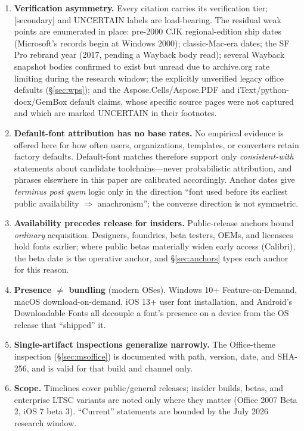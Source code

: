 \documentclass[10pt,a4paper]{article}
\begin{document}
\begin{enumerate}[leftmargin=1.5em,itemsep=3pt]
\item \textbf{Verification asymmetry.} Every citation carries its verification tier;
[secondary] and UNCERTAIN labels are load-bearing. The residual weak points are
enumerated in place: pre-2000 CJK regional-edition ship dates (Microsoft's records begin
at Windows 2000); classic-Mac-era dates; the SF Pro rebrand year (2017, pending a Wayback
body read); several Wayback snapshot bodies confirmed to exist but unread due to
archive.org rate limiting during the research window; the explicitly unverified legacy
office defaults (\S\ref{sec:wps}); and the Aspose.Cells/Aspose.PDF and
iText/python-docx/GemBox default claims, whose specific source pages were not captured and
which are marked UNCERTAIN in their footnotes.
\item \textbf{Default-font attribution has no base rates.} No empirical evidence is
offered here for how often users, organizations, templates, or converters retain factory
defaults. Default-font matches therefore support only \emph{consistent-with} statements
about candidate toolchains---never probabilistic attribution, and phrases elsewhere in
this paper are calibrated accordingly. Anchor dates give \emph{terminus post quem} logic
only in the direction ``font used before its earliest public availability $\Rightarrow$
anachronism''; the converse direction is not symmetric.
\item \textbf{Availability precedes release for insiders.} Public-release anchors bound
\emph{ordinary} acquisition. Designers, foundries, beta testers, OEMs, and licensees hold
fonts earlier; where public betas materially widen early access (Calibri), the beta date
is the operative anchor, and \S\ref{sec:anchors} types each anchor for this reason.
\item \textbf{Presence $\neq$ bundling} (modern OSes). Windows 10+ Feature-on-Demand,
macOS download-on-demand, iOS 13+ user font installation, and Android's Downloadable
Fonts all decouple a font's presence on a device from the OS release that ``shipped'' it.
\item \textbf{Single-artifact inspections generalize narrowly.} The Office-theme
inspection (\S\ref{sec:msoffice}) is documented with path, version, date, and SHA-256, and
is valid for that build and channel only.
\item \textbf{Scope.} Timelines cover public/general releases; insider builds, betas, and
enterprise LTSC variants are noted only where they matter (Office 2007 Beta 2, iOS 7 beta
3). ``Current'' statements are bounded by the July 2026 research window.
\end{enumerate}



\end{document}
